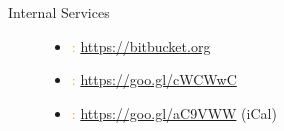 \documentclass{tikzposter} %
\begin{document}
\begin{columns}
{\begin{center}
\begin{description}
					
					\item[Internal Services] \hfill
					\begin{itemize}
						\item \textcolor{orange}{\faBitbucket:} \url{https://bitbucket.org}
						\item \textcolor{orange}{\faCalendar:} \url{https://goo.gl/cWCWwC}
						\item \textcolor{orange}{\faCalendarCheckO:} \url{https://goo.gl/aC9VWW} (iCal)
					\end{itemize}
					
				\end{description}
			\end{center}
			
			
			
}
\end{columns}
\end{document}
